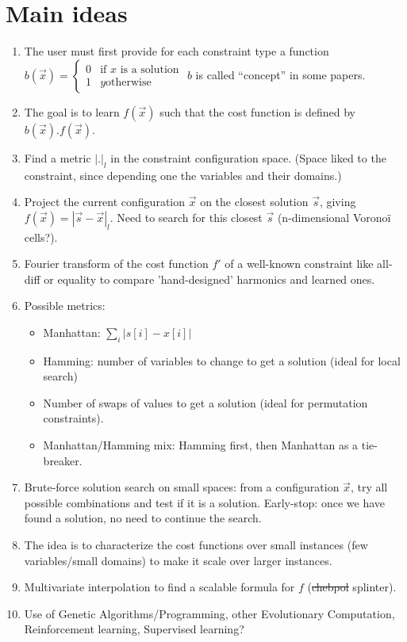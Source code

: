 \documentclass[a4paper, 12pt]{article}
\begin{document}
\section{Main ideas}
\begin{enumerate}
\item The user must first provide for each constraint type a function $b(\vec{x}) = \left\{
  \begin{array}{rl}
    0 & \text{if } x \text{ is a solution}\\
    1 & y\text{otherwise}
  \end{array} \right.$
$b$ is called ``concept'' in some papers.
\item The goal is to learn $f(\vec x)$ such that the cost function is defined by $b(\vec x) . f(\vec x)$.

\item Find a metric $|.|_l$ in the constraint configuration space. (\danger Space liked to the constraint, since depending one the variables and their domains.)
\item Project the current configuration $\vec{x}$ on the closest solution $\vec{s}$, giving $f(\vec x) = |\vec{s}-\vec{x}|_l$. Need to search for this closest $\vec{s}$ (n-dimensional Voronoï cells?).
\item Fourier transform of the cost function $f'$ of a well-known constraint like all-diff or equality to compare 'hand-designed' harmonics and learned ones.
\item Possible metrics:
  \begin{itemize}
  \item Manhattan: $\sum\limits_i |s[i] - x[i]|$
  \item Hamming: number of variables to change to get a solution (ideal for local search)
  \item Number of swaps of values to get a solution (ideal for permutation constraints).
  \item Manhattan/Hamming mix: Hamming first, then Manhattan as a tie-breaker.
  \end{itemize}
\item Brute-force solution search on small spaces: from a configuration $\vec{x}$, try all possible combinations and test if it is a solution. Early-stop: once we have found a solution, no need to continue the search.
\item The idea is to characterize the cost functions over small instances (few variables/small domains) to make it scale over larger instances.
\item Multivariate  interpolation to find  a scalable formula  for $f$
  (\sout{chebpol} splinter).
\item Use of Genetic Algorithms/Programming, other Evolutionary Computation, Reinforcement learning, Supervised learning?
\end{enumerate}
\end{document}
